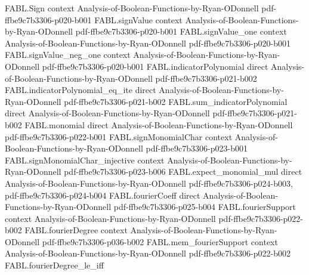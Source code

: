 \begin{theorem}
\label{FABL.abs_fourierWeightAbove_majority_div_tailMain_sub_one_le}
\leanok
{}
\proofstep
  {FABL.Sign}
  {context}
  {Analysis-of-Boolean-Functions-by-Ryan-ODonnell}
  {pdf-ffbe9c7b3306-p020-b001}
\proofstep
  {FABL.signValue}
  {context}
  {Analysis-of-Boolean-Functions-by-Ryan-ODonnell}
  {pdf-ffbe9c7b3306-p020-b001}
\proofstep
  {FABL.signValue_one}
  {context}
  {Analysis-of-Boolean-Functions-by-Ryan-ODonnell}
  {pdf-ffbe9c7b3306-p020-b001}
\proofstep
  {FABL.signValue_neg_one}
  {context}
  {Analysis-of-Boolean-Functions-by-Ryan-ODonnell}
  {pdf-ffbe9c7b3306-p020-b001}
\proofstep
  {FABL.indicatorPolynomial}
  {direct}
  {Analysis-of-Boolean-Functions-by-Ryan-ODonnell}
  {pdf-ffbe9c7b3306-p021-b002}
\proofstep
  {FABL.indicatorPolynomial_eq_ite}
  {direct}
  {Analysis-of-Boolean-Functions-by-Ryan-ODonnell}
  {pdf-ffbe9c7b3306-p021-b002}
\proofstep
  {FABL.sum_indicatorPolynomial}
  {direct}
  {Analysis-of-Boolean-Functions-by-Ryan-ODonnell}
  {pdf-ffbe9c7b3306-p021-b002}
\proofstep
  {FABL.monomial}
  {direct}
  {Analysis-of-Boolean-Functions-by-Ryan-ODonnell}
  {pdf-ffbe9c7b3306-p022-b001}
\proofstep
  {FABL.signMonomialChar}
  {context}
  {Analysis-of-Boolean-Functions-by-Ryan-ODonnell}
  {pdf-ffbe9c7b3306-p023-b001}
\proofstep
  {FABL.signMonomialChar_injective}
  {context}
  {Analysis-of-Boolean-Functions-by-Ryan-ODonnell}
  {pdf-ffbe9c7b3306-p023-b006}
\proofstep
  {FABL.expect_monomial_mul}
  {direct}
  {Analysis-of-Boolean-Functions-by-Ryan-ODonnell}
  {pdf-ffbe9c7b3306-p024-b003,
    pdf-ffbe9c7b3306-p024-b004}
\proofstep
  {FABL.fourierCoeff}
  {direct}
  {Analysis-of-Boolean-Functions-by-Ryan-ODonnell}
  {pdf-ffbe9c7b3306-p025-b004}
\proofstep
  {FABL.fourierSupport}
  {context}
  {Analysis-of-Boolean-Functions-by-Ryan-ODonnell}
  {pdf-ffbe9c7b3306-p022-b002}
\proofstep
  {FABL.fourierDegree}
  {context}
  {Analysis-of-Boolean-Functions-by-Ryan-ODonnell}
  {pdf-ffbe9c7b3306-p036-b002}
\proofstep
  {FABL.mem_fourierSupport}
  {context}
  {Analysis-of-Boolean-Functions-by-Ryan-ODonnell}
  {pdf-ffbe9c7b3306-p022-b002}
\proofstep
  {FABL.fourierDegree_le_iff}

\end{theorem}
